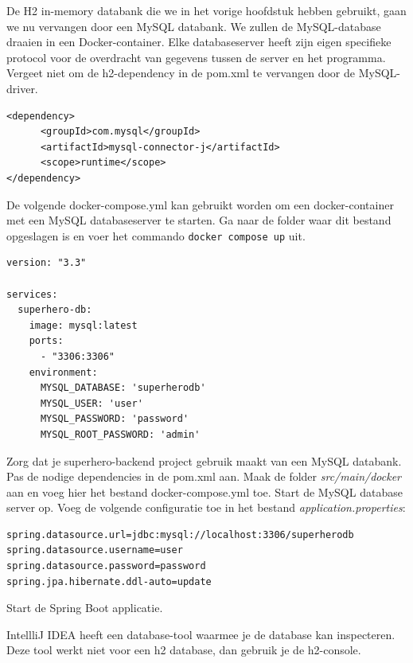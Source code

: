 De H2 in-memory databank die we in het vorige hoofdstuk hebben gebruikt, gaan we nu vervangen door een MySQL databank. 
We zullen de MySQL-database draaien in een Docker-container.  Elke databaseserver heeft zijn eigen specifieke protocol voor de overdracht van gegevens tussen de server en  het programma.  Vergeet niet om de h2-dependency in de pom.xml te vervangen door de MySQL-driver.

\begin{lstlisting}
<dependency>
      <groupId>com.mysql</groupId>
      <artifactId>mysql-connector-j</artifactId>
      <scope>runtime</scope>
</dependency>
\end{lstlisting}

De volgende docker-compose.yml kan gebruikt worden om een docker-container met een MySQL databaseserver te starten. 
Ga naar de folder waar dit bestand opgeslagen is en voer het commando \verb|docker compose up| uit.

\begin{lstlisting}
version: "3.3"

services:
  superhero-db:
    image: mysql:latest
    ports:
      - "3306:3306"
    environment:
      MYSQL_DATABASE: 'superherodb'
      MYSQL_USER: 'user'
      MYSQL_PASSWORD: 'password'
      MYSQL_ROOT_PASSWORD: 'admin'
\end{lstlisting}

\begin{oefening}
Zorg dat je superhero-backend project gebruik maakt van een MySQL databank. 
Pas de nodige dependencies in de pom.xml aan. Maak de folder \textit{src/main/docker} aan en voeg hier het bestand docker-compose.yml toe. 
Start de MySQL database server op. Voeg de volgende configuratie toe in het bestand \textit{application.properties}:

\begin{lstlisting}
spring.datasource.url=jdbc:mysql://localhost:3306/superherodb
spring.datasource.username=user
spring.datasource.password=password
spring.jpa.hibernate.ddl-auto=update
\end{lstlisting}

Start de Spring Boot applicatie. 
\end{oefening}

IntellliJ IDEA heeft een database-tool waarmee je de database kan inspecteren. Deze tool werkt niet voor een h2 database, dan gebruik je de h2-console.


